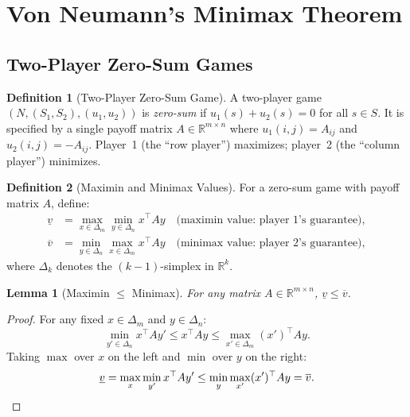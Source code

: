 \documentclass[11pt,a4paper]{article}
\theoremstyle{definition}
\newtheorem{definition}{Definition}[section]
\theoremstyle{plain}
\newtheorem{lemma}[theorem]{Lemma}
\theoremstyle{remark}
\newcommand{\R}{\mathbb{R}}
\begin{document}
\section{Von Neumann's Minimax Theorem}
\label{sec:minimax}

\subsection{Two-Player Zero-Sum Games}
\label{subsec:zero_sum}

\begin{definition}[Two-Player Zero-Sum Game]
\label{def:zero_sum}
A two-player game $(N, (S_1, S_2), (u_1, u_2))$ is \emph{zero-sum} if
$u_1(s) + u_2(s) = 0$ for all $s \in S$. It is specified by a single payoff matrix
$A \in \R^{m \times n}$ where $u_1(i,j) = A_{ij}$ and $u_2(i,j) = -A_{ij}$.
Player~1 (the ``row player'') maximizes; player~2 (the ``column player'') minimizes.
\end{definition}

\begin{definition}[Maximin and Minimax Values]
\label{def:maximin}
For a zero-sum game with payoff matrix $A$, define:
\begin{align*}
    \underline{v} &= \max_{x \in \Delta_m} \min_{y \in \Delta_n} x^\top A y
    \quad \text{(maximin value: player~1's guarantee)}, \\
    \overline{v} &= \min_{y \in \Delta_n} \max_{x \in \Delta_m} x^\top A y
    \quad \text{(minimax value: player~2's guarantee)},
\end{align*}
where $\Delta_k$ denotes the $(k-1)$-simplex in $\R^k$.
\end{definition}

\begin{lemma}[Maximin $\leq$ Minimax]
\label{lem:maximin_leq}
For any matrix $A \in \R^{m \times n}$, $\underline{v} \leq \overline{v}$.
\end{lemma}

\begin{proof}
For any fixed $x \in \Delta_m$ and $y \in \Delta_n$:
\[
    \min_{y' \in \Delta_n} x^\top A y' \leq x^\top A y
    \leq \max_{x' \in \Delta_m} (x')^\top A y.
\]
Taking $\max$ over $x$ on the left and $\min$ over $y$ on the right:
\[
    \underline{v} = \max_x \min_{y'} x^\top A y'
    \leq \min_y \max_{x'} (x')^\top A y = \overline{v}. \qedhere
\]
\end{proof}
\end{document}
